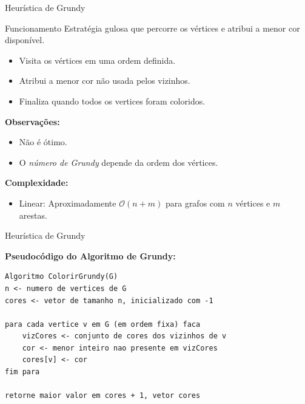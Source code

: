 \begin{frame}{Heurística de Grundy}
\begin{block}{Funcionamento}
    Estratégia gulosa que percorre os vértices e atribui a menor cor disponível.

    \begin{itemize}
    \item Visita os vértices em uma ordem definida.
    \item Atribui a menor cor não usada pelos vizinhos.
    \item Finaliza quando todos os vertices foram coloridos.
    \end{itemize}

\end{block}



\textbf{Observações:}
\begin{itemize}
    \item Não é ótimo.
    \item O \textit{número de Grundy} depende da ordem dos vértices.
\end{itemize}

\textbf{Complexidade:}
\begin{itemize}
    \item Linear: Aproximadamente $\mathcal{O}(n + m)$ para grafos com $n$ vértices e $m$ arestas.
\end{itemize}
\end{frame}

\begin{frame}[fragile]{Heurística de Grundy}

\textbf{Pseudocódigo do Algoritmo de Grundy:}

\begin{lstlisting}[style=portugolStyle, caption={Implementação em pseudocódigo da heurística de Grundy}]
Algoritmo ColorirGrundy(G)
n <- numero de vertices de G
cores <- vetor de tamanho n, inicializado com -1

para cada vertice v em G (em ordem fixa) faca
    vizCores <- conjunto de cores dos vizinhos de v
    cor <- menor inteiro nao presente em vizCores
    cores[v] <- cor
fim para

retorne maior valor em cores + 1, vetor cores
\end{lstlisting}

\end{frame}

